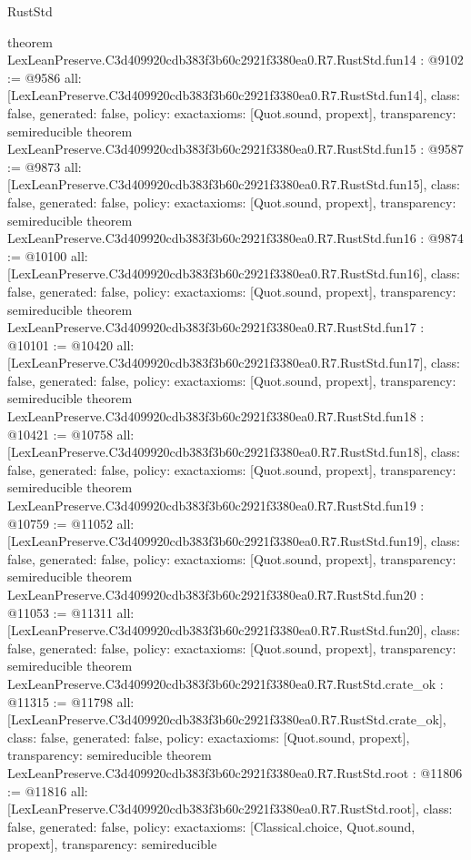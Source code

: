 \begin{lexlean}{RustStd}
\begin{coremodule}
{}
theorem LexLeanPreserve.C3d409920cdb383f3b60c2921f3380ea0.R7.RustStd.fun14 : @9102 := @9586 {
  all: [LexLeanPreserve.C3d409920cdb383f3b60c2921f3380ea0.R7.RustStd.fun14],
  class: false,
  generated: false,
  policy: exact{axioms: [Quot.sound, propext]},
  transparency: semireducible
}
theorem LexLeanPreserve.C3d409920cdb383f3b60c2921f3380ea0.R7.RustStd.fun15 : @9587 := @9873 {
  all: [LexLeanPreserve.C3d409920cdb383f3b60c2921f3380ea0.R7.RustStd.fun15],
  class: false,
  generated: false,
  policy: exact{axioms: [Quot.sound, propext]},
  transparency: semireducible
}
theorem LexLeanPreserve.C3d409920cdb383f3b60c2921f3380ea0.R7.RustStd.fun16 : @9874 := @10100 {
  all: [LexLeanPreserve.C3d409920cdb383f3b60c2921f3380ea0.R7.RustStd.fun16],
  class: false,
  generated: false,
  policy: exact{axioms: [Quot.sound, propext]},
  transparency: semireducible
}
theorem LexLeanPreserve.C3d409920cdb383f3b60c2921f3380ea0.R7.RustStd.fun17 : @10101 := @10420 {
  all: [LexLeanPreserve.C3d409920cdb383f3b60c2921f3380ea0.R7.RustStd.fun17],
  class: false,
  generated: false,
  policy: exact{axioms: [Quot.sound, propext]},
  transparency: semireducible
}
theorem LexLeanPreserve.C3d409920cdb383f3b60c2921f3380ea0.R7.RustStd.fun18 : @10421 := @10758 {
  all: [LexLeanPreserve.C3d409920cdb383f3b60c2921f3380ea0.R7.RustStd.fun18],
  class: false,
  generated: false,
  policy: exact{axioms: [Quot.sound, propext]},
  transparency: semireducible
}
theorem LexLeanPreserve.C3d409920cdb383f3b60c2921f3380ea0.R7.RustStd.fun19 : @10759 := @11052 {
  all: [LexLeanPreserve.C3d409920cdb383f3b60c2921f3380ea0.R7.RustStd.fun19],
  class: false,
  generated: false,
  policy: exact{axioms: [Quot.sound, propext]},
  transparency: semireducible
}
theorem LexLeanPreserve.C3d409920cdb383f3b60c2921f3380ea0.R7.RustStd.fun20 : @11053 := @11311 {
  all: [LexLeanPreserve.C3d409920cdb383f3b60c2921f3380ea0.R7.RustStd.fun20],
  class: false,
  generated: false,
  policy: exact{axioms: [Quot.sound, propext]},
  transparency: semireducible
}
theorem LexLeanPreserve.C3d409920cdb383f3b60c2921f3380ea0.R7.RustStd.crate_ok : @11315 := @11798 {
  all: [LexLeanPreserve.C3d409920cdb383f3b60c2921f3380ea0.R7.RustStd.crate_ok],
  class: false,
  generated: false,
  policy: exact{axioms: [Quot.sound, propext]},
  transparency: semireducible
}
theorem LexLeanPreserve.C3d409920cdb383f3b60c2921f3380ea0.R7.RustStd.root : @11806 := @11816 {
  all: [LexLeanPreserve.C3d409920cdb383f3b60c2921f3380ea0.R7.RustStd.root],
  class: false,
  generated: false,
  policy: exact{axioms: [Classical.choice, Quot.sound, propext]},
  transparency: semireducible
}


\end{coremodule}
\end{lexlean}
